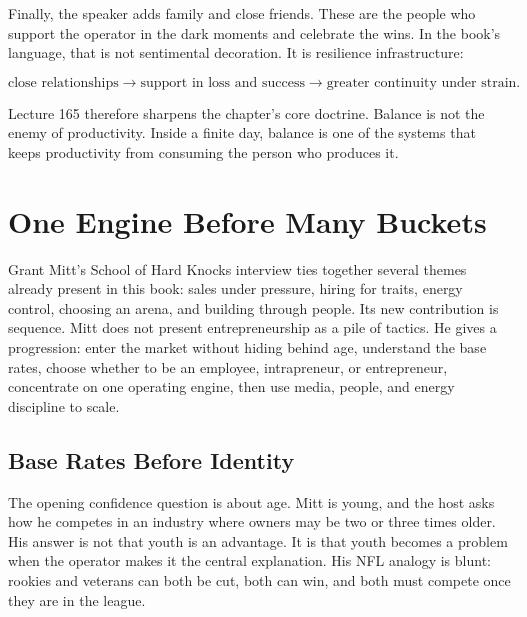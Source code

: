 \documentclass[11pt,oneside]{book}
\begin{document}
Finally, the speaker adds family and close friends. These are the people who support the operator in the dark moments and celebrate the wins. In the book's language, that is not sentimental decoration. It is resilience infrastructure:

\[
\text{close relationships}
\longrightarrow
\text{support in loss and success}
\longrightarrow
\text{greater continuity under strain}.
\]

Lecture 165 therefore sharpens the chapter's core doctrine. Balance is not the enemy of productivity. Inside a finite day, balance is one of the systems that keeps productivity from consuming the person who produces it.


\chapter{One Engine Before Many Buckets}

Grant Mitt's School of Hard Knocks interview ties together several themes already present in this book: sales under pressure, hiring for traits, energy control, choosing an arena, and building through people. Its new contribution is sequence. Mitt does not present entrepreneurship as a pile of tactics. He gives a progression: enter the market without hiding behind age, understand the base rates, choose whether to be an employee, intrapreneur, or entrepreneur, concentrate on one operating engine, then use media, people, and energy discipline to scale.

\section{Base Rates Before Identity}

The opening confidence question is about age. Mitt is young, and the host asks how he competes in an industry where owners may be two or three times older. His answer is not that youth is an advantage. It is that youth becomes a problem when the operator makes it the central explanation. His NFL analogy is blunt: rookies and veterans can both be cut, both can win, and both must compete once they are in the league.
\end{document}
